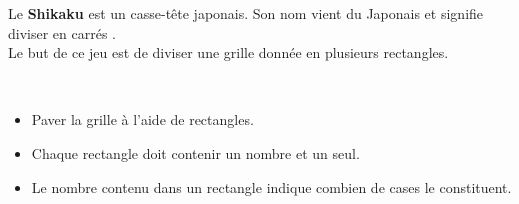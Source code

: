 \Recreation

\begin{enigme}[Shikaku]
   Le {\bf Shikaku} est un casse-tête japonais. Son nom vient du Japonais et signifie \og diviser en carrés \fg. \\
   Le but de ce jeu est de diviser une grille donnée en plusieurs rectangles. \medskip
      
      \ \\[-11mm]
      \begin{itemize}
         \item Paver la grille à l'aide de rectangles.
         \item Chaque rectangle doit contenir un nombre et un seul.
         \item Le nombre contenu dans un rectangle indique combien de cases le constituent. \medskip
      \end{itemize}


\end{enigme}
